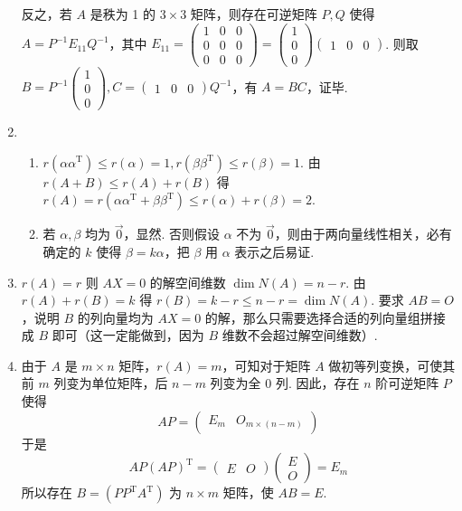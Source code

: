 \begin{enumerate}
          反之，若 $A$ 是秩为 1 的 $3\times 3$ 矩阵，则存在可逆矩阵 $P,Q$ 使得 $A=P^{-1}E_{11}Q^{-1}$，其中 $E_{11}=\begin{pmatrix}1 & 0 & 0 \\ 0 & 0 & 0 \\ 0 & 0 & 0\end{pmatrix}=\begin{pmatrix}1 \\ 0 \\ 0\end{pmatrix}\begin{pmatrix}1 & 0 & 0\end{pmatrix}$. 则取 $B=P^{-1}\begin{pmatrix}1 \\ 0 \\ 0\end{pmatrix},C=\begin{pmatrix}1 & 0 & 0\end{pmatrix}Q^{-1}$，有 $A=BC$，证毕.

    \item \begin{enumerate}
              \item $r(\alpha \alpha^{\mathrm{T}})\leqslant r(\alpha) = 1,r(\beta \beta^{\mathrm{T}})\leqslant r(\beta) = 1$. 由 $r(A+B) \leqslant r(A)+r(B)$ 得 $r(A)=r(\alpha \alpha^{\mathrm{T}}+\beta \beta^{\mathrm{T}}) \leqslant r(\alpha)+r(\beta)=2$.

              \item 若 $\alpha,\beta$ 均为 $\vec{0}$，显然. 否则假设 $\alpha$ 不为 $\vec{0}$，则由于两向量线性相关，必有确定的 $k$ 使得 $\beta = k\alpha$，把 $\beta$ 用 $\alpha$ 表示之后易证.
          \end{enumerate}

    \item $r(A)=r$ 则 $AX=0$ 的解空间维数 $\dim N(A) = n-r$. 由 $r(A)+r(B)=k$ 得 $r(B)=k-r \leqslant n-r=\dim N(A)$. 要求 $AB=O$，说明 $B$ 的列向量均为 $AX=0$ 的解，那么只需要选择合适的列向量组拼接成 $B$ 即可（这一定能做到，因为 $B$ 维数不会超过解空间维数）.

    \item 由于 $A$ 是 $m\times n$ 矩阵，$r(A)=m$，可知对于矩阵 $A$ 做初等列变换，可使其前 $m$ 列变为单位矩阵，后 $n-m$ 列变为全 0 列. 因此，存在 $n$ 阶可逆矩阵 $P$ 使得
          \[AP=\begin{pmatrix}E_m & O_{m\times (n-m)}\end{pmatrix}\]
          于是\[AP(AP)^{\mathrm{T}} = \begin{pmatrix}E & O\end{pmatrix} \begin{pmatrix}E \\ O\end{pmatrix}=E_m\]
          所以存在 $B=(PP^{\mathrm{T}}A^{\mathrm{T}})$ 为 $n\times m$ 矩阵，使 $AB=E$.


\end{enumerate}
